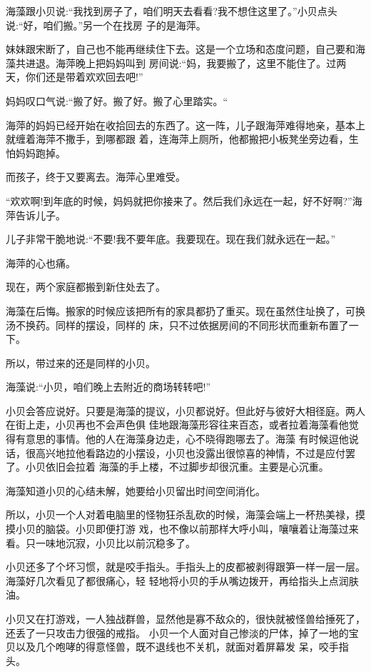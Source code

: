 \documentclass[11pt,a4paper,onecolumn]{article}
\begin{document}
海藻跟小贝说:``我找到房子了，咱们明天去看看?我不想住这里了。''小贝点头说:``好，咱们搬。''另一个在找房
子的是海萍。

妹妹跟宋断了，自己也不能再继续住下去。这是一个立场和态度问题，自己要和海藻共进退。海萍晚上把妈妈叫到
房间说:``妈，我要搬了，这里不能住了。过两天，你们还是带着欢欢回去吧!''

妈妈叹口气说:``搬了好。搬了好。搬了心里踏实。``

海萍的妈妈已经开始在收拾回去的东西了。这一阵，儿子跟海萍难得地亲，基本上就缠着海萍不撒手，到哪都跟
着，连海萍上厕所，他都搬把小板凳坐旁边看，生怕妈妈跑掉。

而孩子，终于又要离去。海萍心里难受。

``欢欢啊!到年底的时候，妈妈就把你接来了。然后我们永远在一起，好不好啊?''海萍告诉儿子。

儿子非常干脆地说:``不要!我不要年底。我要现在。现在我们就永远在一起。''

海萍的心也痛。

现在，两个家庭都搬到新住处去了。

海藻在后悔。搬家的时候应该把所有的家具都扔了重买。现在虽然住址换了，可换汤不换药。同样的摆设，同样的
床，只不过依据房间的不同形状而重新布置了一下。

所以，带过来的还是同样的小贝。

海藻说:``小贝，咱们晚上去附近的商场转转吧!''

小贝会答应说好。只要是海藻的提议，小贝都说好。但此好与彼好大相径庭。两人在街上走，小贝再也不会声色俱
佳地跟海藻形容往来百态，或者拉着海藻看他觉得有意思的事情。他的人在海藻身边走，心不晓得跑哪去了。海藻
有时候逗他说话，很高兴地拉他看路边的小摆设，小贝也没露出很惊喜的神情，不过是应付罢了。小贝依旧会拉着
海藻的手上楼，不过脚步却很沉重。主要是心沉重。

海藻知道小贝的心结未解，她要给小贝留出时间空间消化。

所以，小贝一个人对着电脑里的怪物狂杀乱砍的时候，海藻会端上一杯热美禄，摸摸小贝的脑袋。小贝即便打游
戏，也不像以前那样大呼小叫，嚷嚷着让海藻过来看。只一味地沉寂，小贝比以前沉稳多了。

小贝还多了个坏习惯，就是咬手指头。手指头上的皮都被剥得跟笋一样一层一层。海藻好几次看见了都很痛心，轻
轻地将小贝的手从嘴边拨开，再给指头上点润肤油。

小贝又在打游戏，一人独战群兽，显然他是寡不敌众的，很快就被怪兽给捶死了，还丢了一只攻击力很强的戒指。
小贝一个人面对自己惨淡的尸体，掉了一地的宝贝以及几个咆哮的得意怪兽，既不退线也不关机，就面对着屏幕发
呆，咬手指头。
\end{document}
